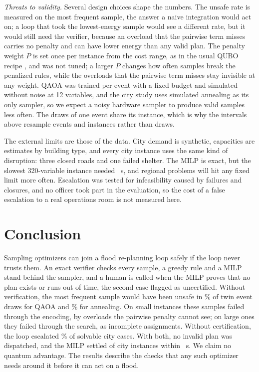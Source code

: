 \documentclass[conference]{IEEEtran}
\begin{document}
\textit{Threats to validity.} Several design choices shape the numbers. The unsafe rate is measured on the most frequent sample, the answer a naive integration would act on; a loop that took the lowest-energy sample would see a different rate, but it would still need the verifier, because an overload that the pairwise term misses carries no penalty and can have lower energy than any valid plan. The penalty weight $P$ is set once per instance from the cost range, as in the usual QUBO recipe \cite{Glover2019}, and was not tuned; a larger $P$ changes how often samples break the penalized rules, while the overloads that the pairwise term misses stay invisible at any weight. QAOA was trained per event with a fixed budget and simulated without noise at 12 variables, and the city study uses simulated annealing as its only sampler, so we expect a noisy hardware sampler to produce valid samples less often. The draws of one event share its instance, which is why the intervals above resample events and instances rather than draws.

The external limits are those of the data. City demand is synthetic, capacities are estimates by building type, and every city instance uses the same kind of disruption: three closed roads and one failed shelter. The MILP is exact, but the slowest 320-variable instance needed \TimeoutMaxS~s, and regional problems will hit any fixed limit more often. Escalation was tested for infeasibility caused by failures and closures, and no officer took part in the evaluation, so the cost of a false escalation to a real operations room is not measured here.

\section{Conclusion}
Sampling optimizers can join a flood re-planning loop safely if the loop never trusts them. An exact verifier checks every sample, a greedy rule and a MILP stand behind the sampler, and a human is called when the MILP proves that no plan exists or runs out of time, the second case flagged as uncertified. Without verification, the most frequent sample would have been unsafe in \TwinRawQ\% of twin event draws for QAOA and \TwinRawSA\% for annealing. On small instances these samples failed through the encoding, by overloads the pairwise penalty cannot see; on large ones they failed through the search, as incomplete assignments. Without certification, the loop escalated \CityFalseEsc\% of solvable city cases. With both, no invalid plan was dispatched, and the MILP settled \CitySettled{} of \CityN{} city instances within \MilpMaxS~s. We claim no quantum advantage. The results describe the checks that any such optimizer needs around it before it can act on a flood.
\end{document}

